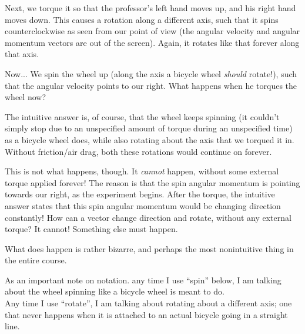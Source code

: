 Next, we torque it so that the professor's left hand moves up, and his right hand moves down. This causes a rotation along a different axis, such that it spins counterclockwise as seen from our point of view (the angular velocity and angular momentum vectors are out of the screen). Again, it rotates like that forever along that axis.

Now... We spin the wheel up (along the axis a bicycle wheel \emph{should} rotate!), such that the angular velocity points to our right. What happens when he torques the wheel now?

The intuitive answer is, of course, that the wheel keeps spinning (it couldn't simply stop due to an unspecified amount of torque during an unspecified time) as a bicycle wheel does, while also rotating about the axis that we torqued it in. Without friction/air drag, both these rotations would continue on forever.

This is not what happens, though. It \emph{cannot} happen, without some external torque applied forever! The reason is that the spin angular momentum is pointing towards our right, as the experiment begins. After the torque, the intuitive answer states that this spin angular momentum would be changing direction constantly! How can a vector change direction and rotate, without any external torque? It cannot! Something else must happen.

What does happen is rather bizarre, and perhaps the most nonintuitive thing in the entire course.

As an important note on notation. any time I use ``spin'' below, I am talking about the wheel spinning like a bicycle wheel is meant to do.\\
Any time I use ``rotate'', I am talking about rotating about a different axis; one that never happens when it is attached to an actual bicycle going in a straight line.

